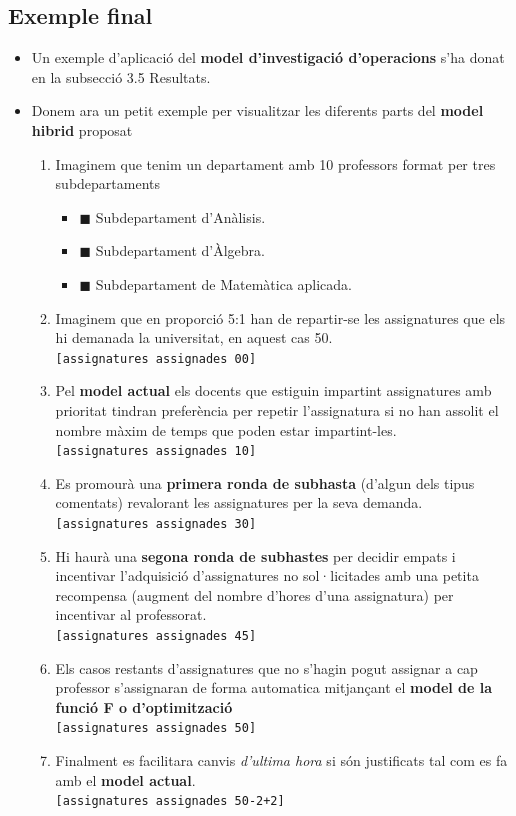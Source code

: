\documentclass[10pt,twocolumn]{article}
\begin{document}
\subsection{Exemple final}
\begin{itemize}
	\item Un exemple d'aplicació del \textbf{model d'investigació d'operacions} s'ha donat en la subsecció 3.5 Resultats.
	\item Donem ara un petit exemple per visualitzar les diferents parts del \textbf{model hibrid} proposat
	\begin{enumerate}
		\item Imaginem que tenim un departament amb 10 professors format per tres subdepartaments 
		\begin{itemize}
			\item {\color{red!60}$\blacksquare$} Subdepartament d'Anàlisis.
			\item {\color{green!60}$\blacksquare$} Subdepartament d'Àlgebra.
			\item {\color{blue!60}$\blacksquare$} Subdepartament de Matemàtica aplicada.
		\end{itemize}
		 \item Imaginem que en proporció 5:1 han de repartir-se les assignatures que els hi demanada la universitat, en aquest cas 50. \\ \texttt{[assignatures assignades 00]}
		 \item Pel \textbf{model actual} els docents que estiguin impartint assignatures amb prioritat tindran preferència per repetir l'assignatura si no han assolit el nombre màxim de temps que poden estar impartint-les. \\ \texttt{[assignatures assignades 10]}
		 \item Es promourà una \textbf{primera ronda de subhasta} (d'algun dels tipus comentats) revalorant les assignatures per la seva demanda. \\ \texttt{[assignatures assignades 30]}
		 \item Hi haurà una \textbf{segona ronda de subhastes} per decidir empats i incentivar l'adquisició d'assignatures no sol·licitades amb una petita recompensa (augment del nombre d'hores d'una assignatura) per incentivar al professorat.\\ \texttt{[assignatures assignades 45]}
		 \item Els casos restants d'assignatures que no s'hagin pogut assignar a cap professor s'assignaran de forma automatica mitjançant el \textbf{model de la funció F o d'optimització} \\ \texttt{[assignatures assignades 50]}
		 \item Finalment es facilitara canvis \textit{d'ultima hora} si són justificats tal com es fa amb el \textbf{model actual}. \\ \texttt{[assignatures assignades 50-2+2]}
		\end{enumerate}
\end{itemize}
\newpage
\end{document}
